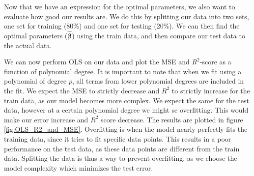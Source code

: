 \documentclass[reprint,english,notitlepage,aps,nobalancelastpage,nofootinbib]{revtex4-1}  %
\newcommand{\vc}[1]{\mathbf{#1}}
\begin{document}
Now that we have an expression for the optimal parameters, we also want to evaluate how good our results are. We do this by splitting our data into two sets, one set for training (80\%) and one set for testing (20\%). We can then find the optimal parameters ($\boldsymbol{\hat{\beta}}$) using the train data, and then compare our test data to the actual data.


We can now perform OLS on our data and plot the MSE and $R^2$-score as a function of polynomial degree. It is important to note that when we fit using a polynomial of degree $p$, all terms from lower polynomial degrees are included in the fit. We expect the MSE to strictly decrease and $R^2$ to strictly increase for the train data, as our model becomes more complex. We expect the same for the test data, however at a certain polynomial degree we might se overfitting. This would make our error increase and $R^2$ score decrease. The results are plotted in figure \ref{fig:OLS_R2_and_MSE}. Overfitting is when the model nearly perfectly fits the training data, since it tries to fit specific data points. This results in a poor performance on the test data, as these data points are different from the train data. Splitting the data is thus a way to prevent overfitting, as we choose the model complexity which minimizes the test error.
\end{document}
